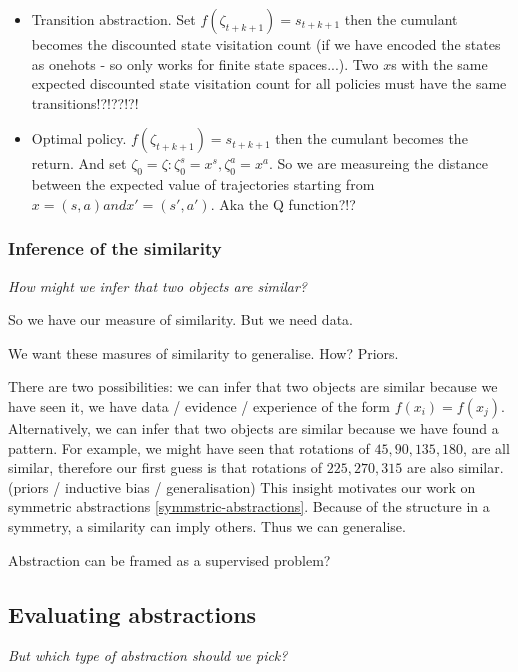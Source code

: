 \begin{itemize}
  \tightlist
  \item Transition abstraction. Set $f(\zeta_{t+k+1}) = s_{t+k+1}$ then the cumulant becomes the discounted state visitation count (if we have encoded the states as onehots - so only works for finite state spaces...). Two $x$s with the same expected discounted state visitation count for all policies must have the same transitions!?!??!?!
  \item Optimal policy. $f(\zeta_{t+k+1}) = s_{t+k+1}$ then the cumulant becomes the return. And set $\zeta_0 = {\zeta: \zeta_0^s = x^s, \zeta_0^a = x^a }$. So we are measureing the distance between the expected value of trajectories starting from $x = (s, a) and x' = (s', a')$. Aka the Q function?!?
\end{itemize}

\subsubsection{Inference of the similarity}

\begin{displayquote}
	\textit{How might we infer that two objects are similar?}
\end{displayquote}

So we have our measure of similarity. But we need data.

We want these masures of similarity to generalise. How? Priors.

There are two possibilities: we can infer that two objects are similar because we have seen it,
we have data / evidence / experience of the form $f(x_i) = f(x_j)$.
Alternatively, we can infer that two objects are similar because we have found a pattern.
For example, we might have seen that rotations of $45, 90, 135, 180$, are all similar, therefore our first guess
is that rotations of $225, 270, 315$ are also similar. (priors / inductive bias / generalisation)
This insight motivates our work on symmetric abstractions \ref{symmstric-abstractions}.
Because of the structure in a symmetry, a similarity can imply others. Thus we can generalise.

Abstraction can be framed as a supervised problem?


\subsection{Evaluating abstractions}

\begin{displayquote}
\textit{But which type of abstraction should we pick?}
\end{displayquote}

